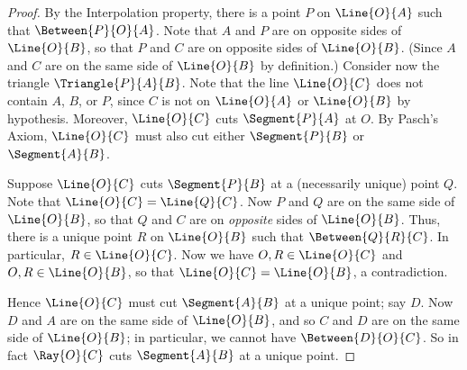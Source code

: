 \documentclass{article}
\begin{document}
\begin{center}
\end{center}

\begin{proof}
By the Interpolation property, there is a point $P$ on $\Line{O}{A}$ such that $\Between{P}{O}{A}$. Note that $A$ and $P$ are on opposite sides of $\Line{O}{B}$, so that $P$ and $C$ are on opposite sides of $\Line{O}{B}$. (Since $A$ and $C$ are on the same side of $\Line{O}{B}$ by definition.) Consider now the triangle $\Triangle{P}{A}{B}$. Note that the line $\Line{O}{C}$ does not contain $A$, $B$, or $P$, since $C$ is not on $\Line{O}{A}$ or $\Line{O}{B}$ by hypothesis. Moreover, $\Line{O}{C}$ cuts $\Segment{P}{A}$ at $O$. By Pasch's Axiom, $\Line{O}{C}$ must also cut either $\Segment{P}{B}$ or $\Segment{A}{B}$.

Suppose $\Line{O}{C}$ cuts $\Segment{P}{B}$ at a (necessarily unique) point $Q$. Note that $\Line{O}{C} = \Line{Q}{C}$. Now $P$ and $Q$ are on the same side of $\Line{O}{B}$, so that $Q$ and $C$ are on \emph{opposite} sides of $\Line{O}{B}$. Thus, there is a unique point $R$ on $\Line{O}{B}$ such that $\Between{Q}{R}{C}$. In particular, $R \in \Line{O}{C}$. Now we have $O,R \in \Line{O}{C}$ and $O, R \in \Line{O}{B}$, so that $\Line{O}{C} = \Line{O}{B}$, a contradiction.

Hence $\Line{O}{C}$ must cut $\Segment{A}{B}$ at a unique point; say $D$. Now $D$ and $A$ are on the same side of $\Line{O}{B}$, and so $C$ and $D$ are on the same side of $\Line{O}{B}$; in particular, we cannot have $\Between{D}{O}{C}$. So in fact $\Ray{O}{C}$ cuts $\Segment{A}{B}$ at a unique point.
\end{proof}
\end{document}
